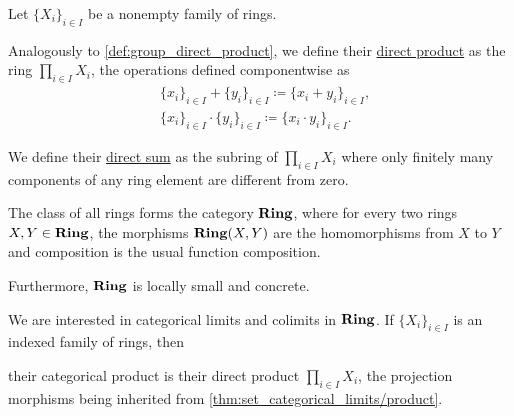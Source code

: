 \begin{definition}\label{def:ring_direct_product}
  Let $\{ X_i \}_{i \in I}$ be a nonempty family of rings.

  Analogously to \cref{def:group_direct_product}, we define their \ul{direct product} as the ring $\prod_{i \in I} X_i$, the operations defined componentwise as
  \begin{align*}
    &\{ x_i \}_{i \in I} + \{ y_i \}_{i \in I}
    \coloneqq
    \{ x_i + y_i \}_{i \in I}, \\
    &\{ x_i \}_{i \in I} \cdot \{ y_i \}_{i \in I}
    \coloneqq
    \{ x_i \cdot y_i \}_{i \in I}.
  \end{align*}

  We define their \ul{direct sum} as the subring of $\prod_{i \in I} X_i$ where only finitely many components of any ring element are different from zero.
\end{definition}

\begin{definition}\label{def:category_of_ring}
  The class of all rings forms the category $\operatorname{\mathbf{Ring}}$, where for every two rings $X, Y \in \operatorname{\mathbf{Ring}}$, the morphisms $\operatorname{\mathbf{Ring}}(X, Y)$ are the homomorphisms from $X$ to $Y$ and composition is the usual function composition.

  Furthermore, $\operatorname{\mathbf{Ring}}$ is locally small and concrete.
\end{definition}

\begin{proposition}\label{thm:ring_categorical_limits}
  We are interested in categorical limits and colimits in $\operatorname{\mathbf{Ring}}$. If $\{ X_i \}_{i \in I}$ is an indexed family of rings, then
  \begin{defenum}
    \item\label{thm:ring_categorical_limits/product} their categorical product is their direct product $\prod_{i \in I} X_i$, the projection morphisms being inherited from \cref{thm:set_categorical_limits/product}.
  \end{defenum}
\end{proposition}
